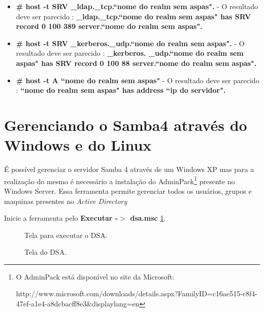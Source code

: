 \begin{itemize}
	\item \textbf{\# host -t SRV \_ldap.\_tcp.``nome do realm sem aspas".} - O resultado deve ser parecido : \textbf{\_ldap.\_tcp.``nome do realm sem aspas" has SRV record 0 100 389 server.``nome do realm sem aspas".}
	\item \textbf{\# host -t SRV \_kerberos.\_udp.``nome do realm sem aspas".} - O resultado deve ser parecido : \textbf{\_kerberos. \_udp.``nome do realm sem aspas" has SRV record 0 100 88 server.``nome do realm sem aspas".}
	\item \textbf{\# host -t A ``nome do realm sem aspas"} - O resultado deve ser parecido : \textbf{``nome do realm sem aspas" has address ``ip do servidor".} 
\end{itemize}

\section{Gerenciando o Samba4 através do Windows e do Linux}

É possível gerenciar o servidor Samba 4 através de um Windows XP mas para a realização do mesmo é necessário a instalação do AdminPack\footnote[4]{O AdminPack está disponível no site da Microsoft:

http://www.microsoft.com/downloads/details.aspx?FamilyID=c16ae515-c8f4-47ef-a1e4-a8dcbacff8e3\&displaylang=en} presente no Windows Server. Essa ferramenta permite gerenciar todos os usuários, grupos e maquinas presentes no \textit{Active Directory}

Inicie a ferramenta pelo \textbf{Executar -$>$ dsa.msc} \ref{dsa}.

\begin{figure}[ht]
   	\centering
   	\caption{Tela para executar o DSA.}
    \label{dsa}
\end{figure}
 

\begin{figure}[h!]
   	\centering
   	\caption{Tela do DSA.}
    \label{tela_dsa}
\end{figure}

